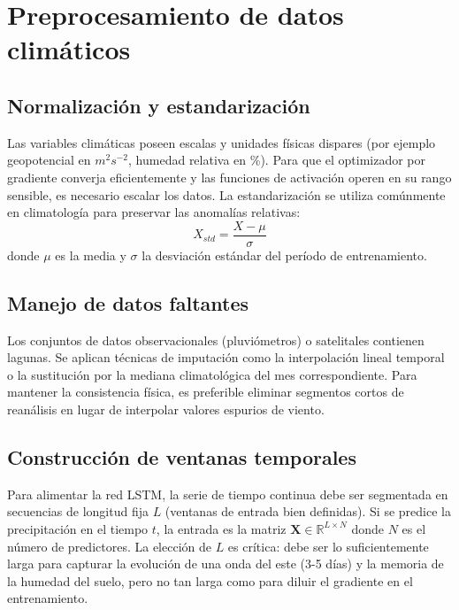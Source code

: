 \section{Preprocesamiento de datos climáticos}
      
\subsection{Normalización y estandarización}
Las variables climáticas poseen escalas y unidades físicas dispares (por ejemplo geopotencial en \(m^2 s^{-2}\), humedad relativa en \%). Para que el optimizador por gradiente converja eficientemente y las funciones de activación operen en su rango sensible, es necesario escalar los datos. La estandarización se utiliza comúnmente en climatología para preservar las anomalías relativas:
\begin{equation}
    X_{std} = \frac{X - \mu}{\sigma}
\end{equation}
donde \(\mu\) es la media y \(\sigma\) la desviación estándar del período de entrenamiento.

\subsection{Manejo de datos faltantes}
Los conjuntos de datos observacionales (pluviómetros) o satelitales contienen lagunas. Se aplican técnicas de imputación como la interpolación lineal temporal o la sustitución por la mediana climatológica del mes correspondiente. Para mantener la consistencia física, es preferible eliminar segmentos cortos de reanálisis en lugar de interpolar valores espurios de viento.

\subsection{Construcción de ventanas temporales}
Para alimentar la red LSTM, la serie de tiempo continua debe ser segmentada en secuencias de longitud fija \(L\) (ventanas de entrada bien definidas). Si se predice la precipitación en el tiempo \(t\), la entrada es la matriz \(\mathbf{X} \in \mathbb{R}^{L \times N}\) donde \(N\) es el número de predictores. La elección de \(L\) es crítica: debe ser lo suficientemente larga para capturar la evolución de una onda del este (3-5 días) y la memoria de la humedad del suelo, pero no tan larga como para diluir el gradiente en el entrenamiento.

